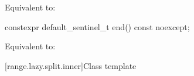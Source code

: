 \begin{itemdescr}
\pnum
\effects
Equivalent to: 
\end{itemdescr}

%
\begin{itemdecl}
constexpr default_sentinel_t end() const noexcept;
\end{itemdecl}

\begin{itemdescr}
\pnum
\effects
Equivalent to: 
\end{itemdescr}

[range.lazy.split.inner]{Class template }

